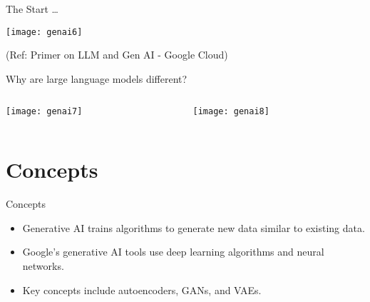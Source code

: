 \begin{frame}[fragile]{The Start \ldots}

\begin{center}
\texttt{[image: genai6]}
\end{center}

{\tiny (Ref: Primer on LLM and Gen AI - Google Cloud)}
  
\end{frame}

\begin{frame}[fragile]{Why are large language models different? }
\begin{columns}
    \begin{column}[T]{0.5\linewidth}
\begin{center}
\texttt{[image: genai7]}
\end{center}
    \end{column}
    \begin{column}[T]{0.5\linewidth}  
	
\begin{center}
\texttt{[image: genai8]}
\end{center}

    \end{column}
  \end{columns}
  
  
\end{frame}

\section{Concepts}

\begin{frame}[fragile]{Concepts}
\begin{itemize}
\item Generative AI trains algorithms to generate new data similar to existing data.
\item Google's generative AI tools use deep learning algorithms and neural networks.
\item Key concepts include autoencoders, GANs, and VAEs.
\end{itemize}
\end{frame}

